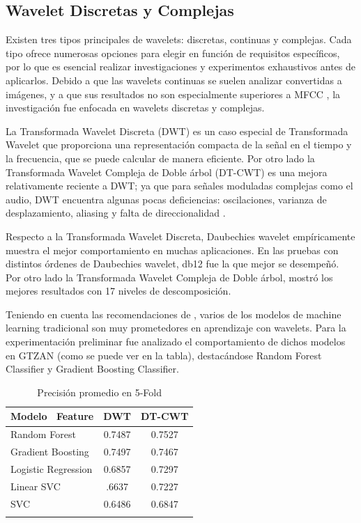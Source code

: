 \documentclass[colorinlistoftodos,twoside,twocolumn,10pt]{article} %
\begin{document}
\subsection {Wavelet Discretas y Complejas}
Existen tres tipos principales de wavelets: discretas, continuas y complejas. Cada tipo ofrece numerosas opciones para elegir en funci\'on de requisitos espec\'ificos, por lo que es esencial realizar investigaciones y experimentos exhaustivos antes de aplicarlos.
Debido a que las wavelets continuas se suelen analizar convertidas a im\'agenes, y a que sus resultados no son especialmente superiores a MFCC \cite{Wavelet Transform for Music Genre Classification}, la investigación fue enfocada en wavelets discretas y complejas. 

La Transformada Wavelet Discreta (DWT) \cite{wavelet transform in machine learning} es un caso especial de Transformada Wavelet que proporciona una representaci\'on compacta de la se\~nal en el tiempo y la frecuencia, que se puede calcular de manera eficiente\cite{Musical Genre Classification Of Audio Signals}. Por otro lado  la Transformada Wavelet Compleja de Doble \'arbol (DT-CWT) \cite{DT-CWT} es una mejora relativamente reciente a DWT; ya que para se\~nales moduladas complejas como el audio, DWT encuentra algunas pocas deficiencias: oscilaciones, varianza de desplazamiento, aliasing y falta de direccionalidad \cite{Wavelet Transform for Music Genre Classification}.

Respecto a la Transformada Wavelet Discreta, Daubechies wavelet  emp\'iricamente muestra el mejor comportamiento en muchas aplicaciones\cite{Wavelet Transform for Music Genre Classification}. En las pruebas con distintos \'ordenes de Daubechies wavelet, db12 fue la que mejor se desempe\~n\'o. Por otro lado la Transformada Wavelet Compleja de Doble \'arbol, mostr\'o los mejores resultados con 17 niveles de descomposici\'on.

Teniendo en cuenta las recomendaciones de \cite{wavelet transform in machine learning}, varios de los modelos de machine learning tradicional son muy prometedores en aprendizaje con wavelets. Para la experimentaci\'on preliminar fue analizado el comportamiento de dichos modelos en GTZAN (como se puede ver en la tabla), destac\'andose Random Forest Classifier y Gradient Boosting Classifier.

\begin{table}[htbp]
\centering
\begin{tabular}{|l||c|c|}
\hline Modelo \ Feature & DWT & DT-CWT\\ %
\hline\hline Random Forest & 0.7487 & 0.7527 \\ 
\hline Gradient Boosting & 0.7497 & 0.7467 \\ %
\hline Logistic Regression & 0.6857 & 0.7297 \\ %
\hline Linear SVC & .6637 & 0.7227 \\ 
\hline SVC & 0.6486 & 0.6847 \\ %
\hline
\caption{Precisión promedio en 5-Fold} 
\label{tabla:2}%
\end{tabular}%
\end{table}
\end{document}
